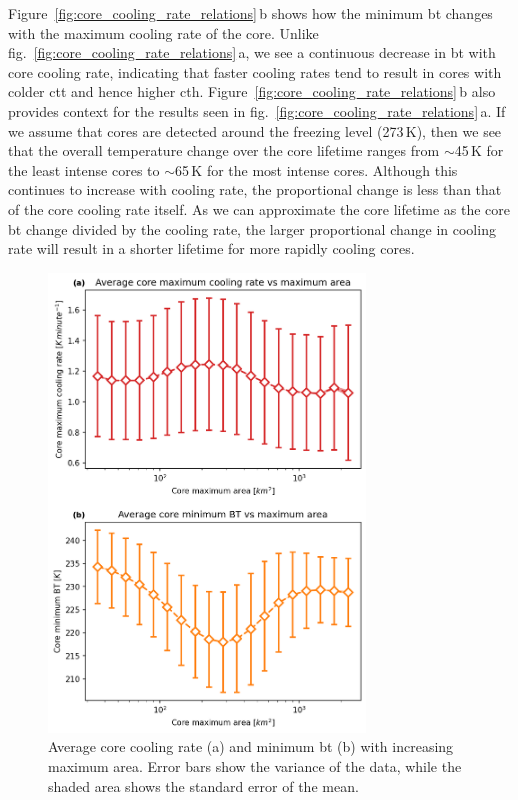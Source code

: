 Figure~\ref{fig:core_cooling_rate_relations}\,b shows how the minimum \acrshort{bt} changes with the maximum cooling rate of the core.
Unlike fig.~\ref{fig:core_cooling_rate_relations}\,a, we see a continuous decrease in \acrshort{bt} with core cooling rate, indicating that faster cooling rates tend to result in cores with colder \acrshort{ctt} and hence higher \acrshort{cth}.
Figure~\ref{fig:core_cooling_rate_relations}\,b also provides context for the results seen in fig.~\ref{fig:core_cooling_rate_relations}\,a.
If we assume that cores are detected around the freezing level (273\,\unit{K}), then we see that the overall temperature change over the core lifetime ranges from $\sim$45\,\unit{K} for the least intense cores to $\sim$65\,\unit{K} for the most intense cores.
Although this continues to increase with cooling rate, the proportional change is less than that of the core cooling rate itself.
As we can approximate the core lifetime as the core \acrshort{bt} change divided by the cooling rate, the larger proportional change in cooling rate will result in a shorter lifetime for more rapidly cooling cores.

\begin{figure}[tp]
    \centering
    \includegraphics[width=0.75\textwidth]{figures/ch2_11.png}
    \caption[
    Average core cooling rate and minimum \acrshort{bt} with increasing maximum area
    ]{
    Average core cooling rate (a) and minimum \acrshort{bt} (b) with increasing maximum area. Error bars show the variance of the data, while the shaded area shows the standard error of the mean.
    }
    \label{fig:core_area_relations}
\end{figure}

